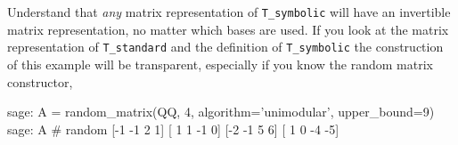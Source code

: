 %
Understand that \emph{any} matrix representation of \verb?T_symbolic? will have an invertible matrix representation, no matter which bases are used.  If you look at the matrix representation of \verb?T_standard? and the definition of \verb?T_symbolic? the construction of this example will be transparent, especially if you know the random matrix constructor,
%
\begin{sageverbatim}
sage: A = random_matrix(QQ, 4, algorithm='unimodular', upper_bound=9)
sage: A                                                      # random
[-1 -1  2  1]
[ 1  1 -1  0]
[-2 -1  5  6]
[ 1  0 -4 -5]
\end{sageverbatim}
%
\begin{sageverbatim}
\end{sageverbatim}
%









